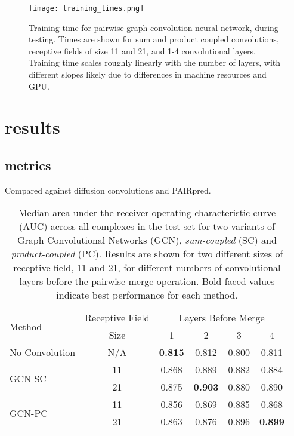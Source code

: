 \begin{figure}
	\texttt{[image: training\_times.png]}
	\caption{Training time for pairwise graph convolution neural network, during testing. Times are shown for sum and product coupled convolutions, receptive fields of size 11 and 21, and 1-4 convolutional layers. Training time scales roughly linearly with the number of layers, with different slopes likely due to differences in machine resources and GPU.
	\label{fig:train_times}}
\end{figure}


\section{results}
\subsection{metrics}

Compared against diffusion convolutions and PAIRpred.

\begin{table}
\begin{center}
	\begin{tabular}{lccccc}
		\toprule
		\multirow{2}{*}{Method} &
		Receptive Field & \multicolumn{4}{c}{Layers Before Merge} \\
		& Size & 1 & {2} & {3} & {4} \\
		\midrule
		No Convolution & N/A & \textbf{0.815} & 0.812 & 0.800 & 0.811  \\\cline{1-6}
		\multirow{2}{*}{GCN-SC} & 11 & 0.868 & 0.889 & 0.882 & 0.884 \\
		& 21 & 0.875 & \textbf{0.903} & 0.880 & 0.890 \\\cline{1-6}
		\multirow{2}{*}{GCN-PC} & 11 & 0.856 & 0.869 & 0.885 & 0.868 \\
		& 21 & 0.863 & 0.876 & 0.896 & \textbf{0.899} \\
		\bottomrule
	\end{tabular}
	\caption{\small Median area under the receiver operating characteristic curve (AUC) across all complexes in the test set for two variants of Graph Convolutional Networks (GCN), \textit{sum-coupled} (SC) and \textit{product-coupled} (PC). Results are shown for two different sizes of receptive field, 11 and 21, for different numbers of convolutional layers before the pairwise merge operation. Bold faced values indicate best performance for each method.}
	\label{tab:med_auc}
\end{center}
\end{table}

